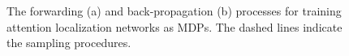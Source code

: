 \documentclass[runningheads]{llncs}
\begin{document}
\begin{figure}[htb]
  \begin{center}
    \hspace{0.05in}%
  \end{center}
\caption{The forwarding (a) and back-propagation (b) processes for training attention localization networks as MDPs. The dashed lines indicate the sampling procedures. }
\end{figure}
\end{document}
